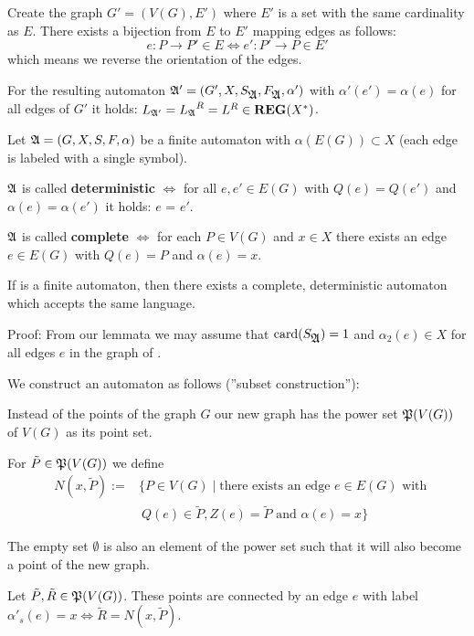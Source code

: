 Create the graph $G' = (V(G), E')$ where $E'$ is a set with the same cardinality
as $E$. There exists a bijection from $E$ to $E'$ mapping edges as follows:
\[ e : P \to P' \in E \Leftrightarrow e' : P' \to P \in E' \]
which means we reverse the orientation of the edges.

For the resulting automaton $\mbox{$\mathfrak{A'}$} = (G', X, S_{\mbox{$\mathfrak{A}$}},
F_{\mbox{$\mathfrak{A}$}}, \alpha')$ with $\alpha'(e') = \alpha(e)$ for all edges of $G'$
it holds: $\mbox{$L_{\mathfrak{A'}}$} = \mbox{$L_{\mathfrak{A}}$}^R = L^R \in \mbox{{\bf REG}}(X^*)$.

\begin{definition}
Let $\mbox{$\mathfrak{A}$} = (G, X, S, F, \alpha)$ be a finite automaton with
$\alpha(E(G)) \subset X$ (each edge is labeled with a single
symbol).

$\mbox{$\mathfrak{A}$}$ is called {\bf deterministic} $\Leftrightarrow$ for all $e, e'
\in E(G)$ with $Q(e) = Q(e')$ and $\alpha(e) = \alpha(e')$ it holds: $e$ = $e'$.

$\mbox{$\mathfrak{A}$}$ is called {\bf complete} $\Leftrightarrow$ for each $P \in V(G)$
and $x \in X$ there exists an edge $e \in E(G)$ with $Q(e) = P$ and $\alpha(e)
= x$.
\end{definition}

\begin{theorem}
If  is a finite automaton, then there exists a complete,
deterministic automaton  which accepts the same language.
\end{theorem}

Proof: From our lemmata we may assume that $\mathrm{card}(S_{\mbox{$\mathfrak{A}$}}) = 1$ and
$\alpha_2(e) \in X$ for all edges $e$ in the graph of .

We construct an automaton  as follows (''subset construction''):

Instead of the points of the graph $G$ our new graph has the power set
$\mathfrak{P}(V(G))$ of $V(G)$ as its point set.

For $\tilde{P} \in \mathfrak{P}(V(G))$ we define 
\begin{eqnarray*}
& N(x, \tilde{P}) := & \{ P \in V(G) \mid \mbox{there exists an edge } e \in
E(G) \mbox{ with } \\
& & \ Q(e) \in \tilde{P}, Z(e) = \tilde{P} \mbox{ and } \alpha(e) = x \} 
\end{eqnarray*}

The empty set $\emptyset$ is also an element of the power set such that it will
also become a point of the new graph.

Let $\tilde{P}, \tilde{R} \in \mathfrak{P}(V(G))$. These points are connected by an
edge $e$ with label $\alpha'_s(e) = x \Leftrightarrow \tilde{R} = N(x, \tilde{P})$.

